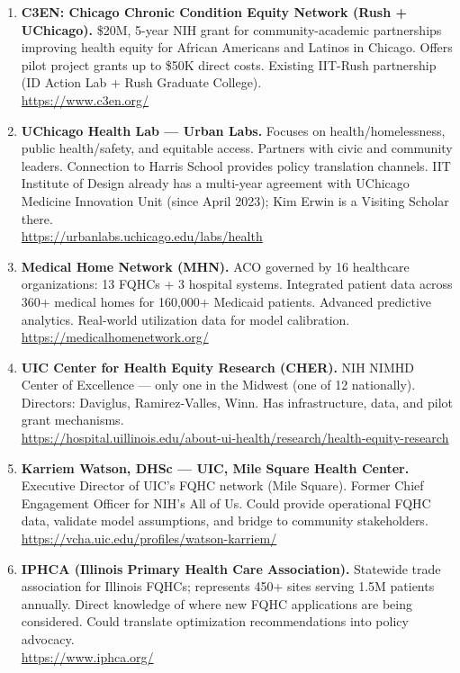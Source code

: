 \documentclass[11pt]{article}
\begin{document}
\begin{enumerate}

\item \textbf{C3EN: Chicago Chronic Condition Equity Network (Rush + UChicago).}
\$20M, 5-year NIH grant for community-academic partnerships improving health equity for African Americans and Latinos in Chicago. Offers pilot project grants up to \$50K direct costs. Existing IIT-Rush partnership (ID Action Lab + Rush Graduate College). \\
\url{https://www.c3en.org/}

\item \textbf{UChicago Health Lab — Urban Labs.}
Focuses on health/homelessness, public health/safety, and equitable access. Partners with civic and community leaders. Connection to Harris School provides policy translation channels. IIT Institute of Design already has a multi-year agreement with UChicago Medicine Innovation Unit (since April 2023); Kim Erwin is a Visiting Scholar there. \\
\url{https://urbanlabs.uchicago.edu/labs/health}

\item \textbf{Medical Home Network (MHN).}
ACO governed by 16 healthcare organizations: 13 FQHCs + 3 hospital systems. Integrated patient data across 360+ medical homes for 160,000+ Medicaid patients. Advanced predictive analytics. Real-world utilization data for model calibration. \\
\url{https://medicalhomenetwork.org/}

\item \textbf{UIC Center for Health Equity Research (CHER).}
NIH NIMHD Center of Excellence — only one in the Midwest (one of 12 nationally). Directors: Daviglus, Ramirez-Valles, Winn. Has infrastructure, data, and pilot grant mechanisms. \\
\url{https://hospital.uillinois.edu/about-ui-health/research/health-equity-research}

\item \textbf{Karriem Watson, DHSc — UIC, Mile Square Health Center.}
Executive Director of UIC's FQHC network (Mile Square). Former Chief Engagement Officer for NIH's All of Us. Could provide operational FQHC data, validate model assumptions, and bridge to community stakeholders. \\
\url{https://vcha.uic.edu/profiles/watson-karriem/}

\item \textbf{IPHCA (Illinois Primary Health Care Association).}
Statewide trade association for Illinois FQHCs; represents 450+ sites serving 1.5M patients annually. Direct knowledge of where new FQHC applications are being considered. Could translate optimization recommendations into policy advocacy. \\
\url{https://www.iphca.org/}


\end{enumerate}
\end{document}
